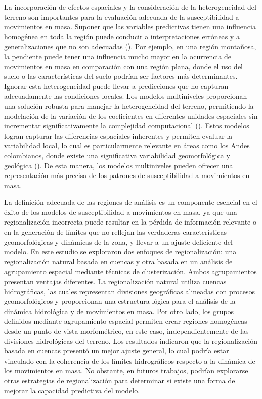 \documentclass[
  manuscript=article,  
  layout=preprint,  
]{format}
\begin{document}
La incorporación de efectos espaciales y la consideración de la heterogeneidad del terreno son importantes para la evaluación adecuada de la susceptibilidad a movimientos en masa. Suponer que las variables predictivas tienen una influencia homogénea en toda la región puede conducir a interpretaciones erróneas y a generalizaciones que no son adecuadas (\cite{anselin1990spatial, lesage2009introduction}). Por ejemplo, en una región montañosa, la pendiente puede tener una influencia mucho mayor en la ocurrencia de movimientos en masa en comparación con una región plana, donde el uso del suelo o las características del suelo podrían ser factores más determinantes. Ignorar esta heterogeneidad puede llevar a predicciones que no capturan adecuadamente las condiciones locales. Los modelos multiniveles proporcionan una solución robusta para manejar la heterogeneidad del terreno, permitiendo la modelación de la variación de los coeficientes en diferentes unidades espaciales sin incrementar significativamente la complejidad computacional (\cite{wong1985hierarchical}). Estos modelos logran capturar las diferencias espaciales inherentes y permiten evaluar la variabilidad local, lo cual es particularmente relevante en áreas como los Andes colombianos, donde existe una significativa variabilidad geomorfológica y geológica (\cite{aristizabal2015susceptibility}). De esta manera, los modelos multiniveles pueden ofrecer una representación más precisa de los patrones de susceptibilidad a movimientos en masa.

La definición adecuada de las regiones de análisis es un componente esencial en el éxito de los modelos de susceptibilidad a movimientos en masa, ya que una regionalización incorrecta puede resultar en la pérdida de información relevante o en la generación de límites que no reflejan las verdaderas características geomorfológicas y dinámicas de la zona, y llevar a un ajuste deficiente del modelo. En este estudio se exploraron dos enfoques de regionalización: una regionalización natural basada en cuencas y otra basada en un análisis de agrupamiento espacial mediante técnicas de clusterización. Ambos agrupamientos presentan ventajas diferentes. La regionalización natural utiliza cuencas hidrográficas, las cuales representan divisiones geográficas alineadas con procesos geomorfológicos y proporcionan una estructura lógica para el análisis de la dinámica hidrológica y de movimientos en masa. Por otro lado, los grupos definidos mediante agrupamiento espacial permiten crear regiones homogéneas desde un punto de vista morfométrico, en este caso, independientemente de las divisiones hidrológicas del terreno. Los resultados indicaron que la regionalización basada en cuencas presentó un mejor ajuste general, lo cual podría estar vinculado con la coherencia de los límites hidrográficos respecto a la dinámica de los movimientos en masa. No obstante, en futuros trabajos, podrían explorarse otras estrategias de regionalización para determinar si existe una forma de mejorar la capacidad predictiva del modelo.
\end{document}
